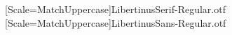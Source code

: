 \ifLuaTeX
\usepackage[bidi=basic]{babel}
\else
\usepackage[bidi=default]{babel}
\fi


[Scale=MatchUppercase]{LibertinusSerif-Regular.otf}
[Scale=MatchUppercase]{LibertinusSans-Regular.otf}

